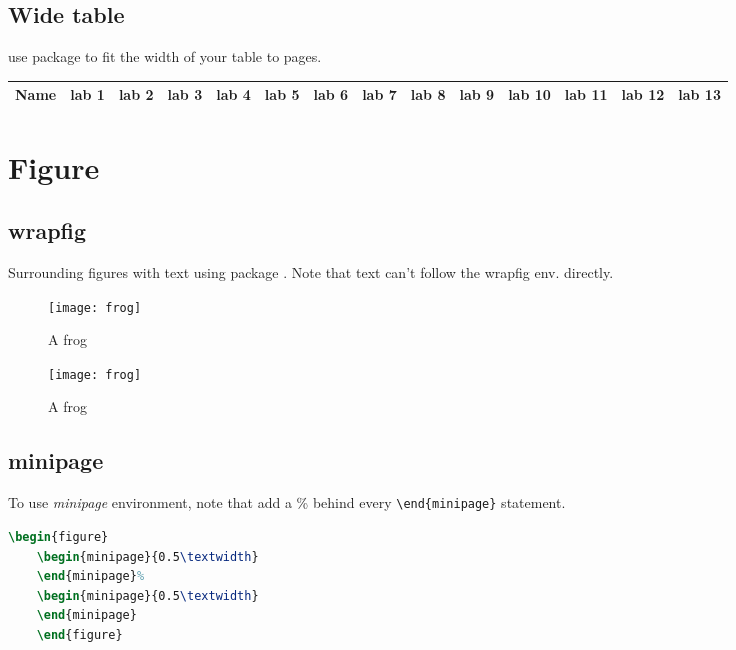 \subsection{Wide table}
use package  to fit the width of your table to pages.

\begin{adjustbox}{center}
    \large
    \begin{tabular}{|l|c|c|c|c|c|c|c|c|c|c|c|c|c|}
	\hline
	Name    & lab 1 & lab 2 & lab 3 & lab 4 & lab 5 & lab 6 & lab 7 & lab 8 & lab 9 & lab 10 & lab 11 & lab 12 & lab 13    \\
	\hline
    \end{tabular}
\end{adjustbox}



\section{Figure}

\subsection{wrapfig}
Surrounding figures with text using package . Note
that text can't follow the wrapfig env. directly.

\begin{wrapfigure}{L}{0.3\textwidth}
    \centering 
    \texttt{[image: frog]}
    \caption{\label{fig:frog}A frog}
\end{wrapfigure}

\lipsum[1]

\begin{wrapfigure}{R}{0.3\textwidth}
    \centering 
    \texttt{[image: frog]}
    \caption{\label{fig:frog}A frog}
\end{wrapfigure}

\lipsum[2]


\subsection{minipage}
To use \emph{minipage} environment, note that add a \% behind every 
\verb|\end{minipage}| statement.
\begin{lstlisting}[language=TeX]
    \begin{figure}
	\begin{minipage}{0.5\textwidth}
	\end{minipage}%
	\begin{minipage}{0.5\textwidth}
	\end{minipage}
    \end{figure}
\end{lstlisting}
